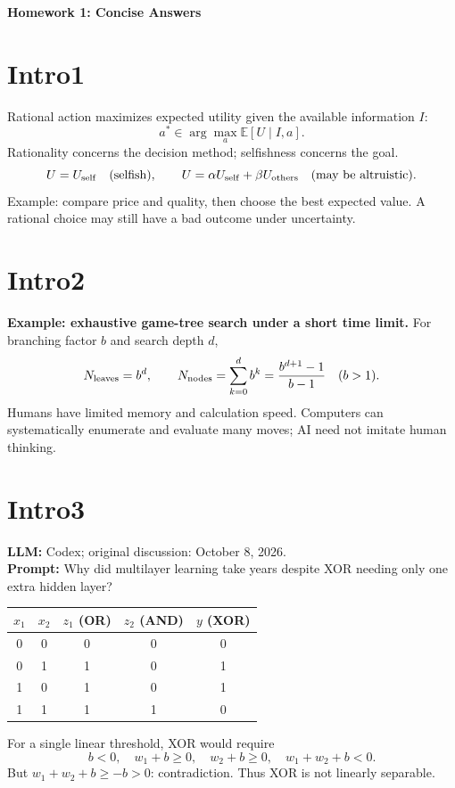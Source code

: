 \documentclass[11pt,a4paper]{article}
\begin{document}
\begin{center}{\Large\bfseries Homework 1: Concise Answers}\end{center}
\section*{Intro1}
Rational action maximizes expected utility given the available information $I$:
\[
\boxed{a^*\in\arg\max_a\mathbb E[U\mid I,a]}.
\]
Rationality concerns the decision method; selfishness concerns the goal.
\[
U=U_{\rm self}\quad\text{(selfish)},\qquad
U=\alpha U_{\rm self}+\beta U_{\rm others}\quad\text{(may be altruistic)}.
\]
Example: compare price and quality, then choose the best expected value.
A rational choice may still have a bad outcome under uncertainty.

\section*{Intro2}
\textbf{Example: exhaustive game-tree search under a short time limit.}
For branching factor $b$ and search depth $d$,
\[
N_{\rm leaves}=b^d,\qquad
N_{\rm nodes}=\sum_{k=0}^d b^k=\frac{b^{d+1}-1}{b-1}\quad(b>1).
\]
Humans have limited memory and calculation speed. Computers can systematically enumerate and evaluate many moves; AI need not imitate human thinking.

\newpage
\section*{Intro3}
\textbf{LLM:} Codex; original discussion: October 8, 2026.\\
\textbf{Prompt:} Why did multilayer learning take years despite XOR needing only one extra hidden layer?

\begin{center}\begin{tabular}{cc|cc|c}\toprule
$x_1$&$x_2$&$z_1$ (OR)&$z_2$ (AND)&$y$ (XOR)\\\midrule
0&0&0&0&0\\0&1&1&0&1\\1&0&1&0&1\\1&1&1&1&0\\\bottomrule
\end{tabular}\end{center}
For a single linear threshold, XOR would require
\[
b<0,\quad w_1+b\ge0,\quad w_2+b\ge0,\quad w_1+w_2+b<0.
\]
But $w_1+w_2+b\ge-b>0$: contradiction. Thus XOR is not linearly separable.
\end{document}
